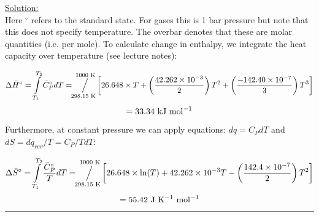 \noindent
\underline{Solution:}\\

Here $^\circ$ refers to the standard state. For gases this is 1 bar pressure but note that this does not specify temperature. The overbar denotes that these are molar quantities (i.e. per mole). To calculate change in enthalpy, we integrate the heat capacity over temperature (see lecture notes):

$$\Delta\bar{H}^\circ = \int\limits_{T_1}^{T_2}\bar{C}_P^\circ dT = \sijoitus{298.15\textnormal{ K}}{1000\textnormal{ K}}\left[ 26.648\times T + \left(\frac{42.262\times 10^{-3}}{2}\right)T^2 + \left(\frac{-142.40\times 10^{-7}}{3}\right)T^3\right]$$
$$= 33.34\textnormal{ kJ mol}^{-1}$$

Furthermore, at constant pressure we can apply equations: $dq = C_P dT$ and $dS = dq_{rev} / T = C_P / T dT$:

$$\Delta\bar{S}^\circ = \int\limits_{T_1}^{T_2}\frac{\bar{C}_P^\circ}{T}dT = \sijoitus{298.15\textnormal{ K}}{1000\textnormal{ K}}\left[26.648\times\ln(T) + 42.262\times 10^{-3}T - \left(\frac{142.4\times 10^{-7}}{2}\right)T^2\right]$$
$$ = 55.42\textnormal{ J K}^{-1}\textnormal{ mol}^{-1}$$

\hrule\vspace{0.5cm}
